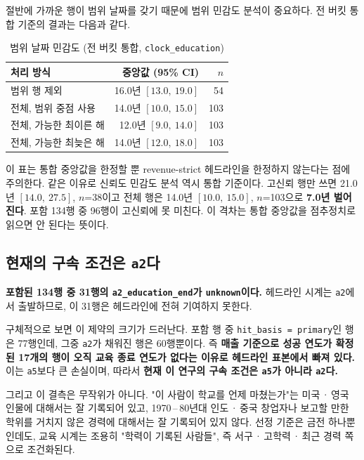 \documentclass[11pt]{article}
\begin{document}
절반에 가까운 행이 범위 날짜를 갖기 때문에 범위 민감도 분석이 중요하다.
전 버킷 통합 기준의 결과는 다음과 같다.

\begin{table}[h]
\centering
\caption{범위 날짜 민감도 (전 버킷 통합, \texttt{clock\_education})}
\begin{tabular}{L R R}
\toprule
처리 방식 & 중앙값 (95\% CI) & $n$ \\
\midrule
범위 행 제외 & 16.0년 $[13.0,\ 19.0]$ & \phantom{0}54 \\
전체, 범위 중점 사용 & 14.0년 $[10.0,\ 15.0]$ & 103 \\
전체, 가능한 최이른 해 & 12.0년 $[9.0,\ 14.0]$ & 103 \\
전체, 가능한 최늦은 해 & 14.0년 $[12.0,\ 18.0]$ & 103 \\
\bottomrule
\end{tabular}
\end{table}

이 표는 통합 중앙값을 한정할 뿐 revenue-strict 헤드라인을 한정하지 않는다는 점에 주의한다.
같은 이유로 신뢰도 민감도 분석 역시 통합 기준이다.
고신뢰 행만 쓰면 21.0년 $[14.0,\ 27.5]$, $n$=38이고 전체 행은 14.0년 $[10.0,\ 15.0]$, $n$=103으로
\textbf{7.0년 벌어진다}. 포함 134행 중 96행이 고신뢰에 못 미친다.
이 격차는 통합 중앙값을 점추정치로 읽으면 안 된다는 뜻이다.

\subsection{현재의 구속 조건은 \texttt{a2}다}

\textbf{포함된 134행 중 31행의 \texttt{a2\_education\_end}가 \texttt{unknown}이다.}
헤드라인 시계는 \texttt{a2}에서 출발하므로, 이 31행은 헤드라인에 전혀 기여하지 못한다.

구체적으로 보면 이 제약의 크기가 드러난다.
포함 행 중 \texttt{hit\_basis = primary}인 행은 77행인데,
그중 \texttt{a2}가 채워진 행은 60행뿐이다.
즉 \textbf{매출 기준으로 성공 연도가 확정된 17개의 행이 오직 교육 종료 연도가 없다는 이유로
헤드라인 표본에서 빠져 있다.}
이는 \texttt{a5}보다 큰 손실이며, 따라서 \textbf{현재 이 연구의 구속 조건은 \texttt{a5}가 아니라 \texttt{a2}다.}

그리고 이 결측은 무작위가 아니다.
"이 사람이 학교를 언제 마쳤는가"는 미국\,·\,영국 인물에 대해서는 잘 기록되어 있고,
1970\,--\,80년대 인도\,·\,중국 창업자나 보고할 만한 학위를 거치지 않은 경력에 대해서는 잘 기록되어 있지 않다.
선정 기준은 금전 하나뿐인데도, 교육 시계는 조용히
"학력이 기록된 사람들", 즉 서구\,·\,고학력\,·\,최근 경력 쪽으로 조건화된다.
\end{document}
